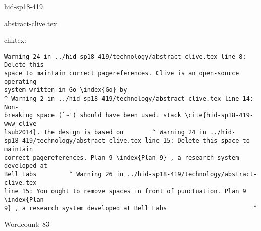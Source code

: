 

\begin{IU}

hid-sp18-419

\href{https://github.com/cloudmesh-community/hid-sp18-419/blob/master//technology/abstract-clive.tex}{abstract-clive.tex}

 
chktex:
\begin{tiny}
\begin{verbatim}
Warning 24 in ../hid-sp18-419/technology/abstract-clive.tex line 8: Delete this
space to maintain correct pagereferences. Clive is an open-source operating
system written in Go \index{Go} by
^ Warning 2 in ../hid-sp18-419/technology/abstract-clive.tex line 14: Non-
breaking space (`~') should have been used. stack \cite{hid-sp18-419-www-clive-
lsub2014}. The design is based on        ^ Warning 24 in ../hid-
sp18-419/technology/abstract-clive.tex line 15: Delete this space to maintain
correct pagereferences. Plan 9 \index{Plan 9} , a research system developed at
Bell Labs         ^ Warning 26 in ../hid-sp18-419/technology/abstract-clive.tex
line 15: You ought to remove spaces in front of punctuation. Plan 9 \index{Plan
9} , a research system developed at Bell Labs                        ^
\end{verbatim}
\end{tiny}

Wordcount: 83

\end{IU}



